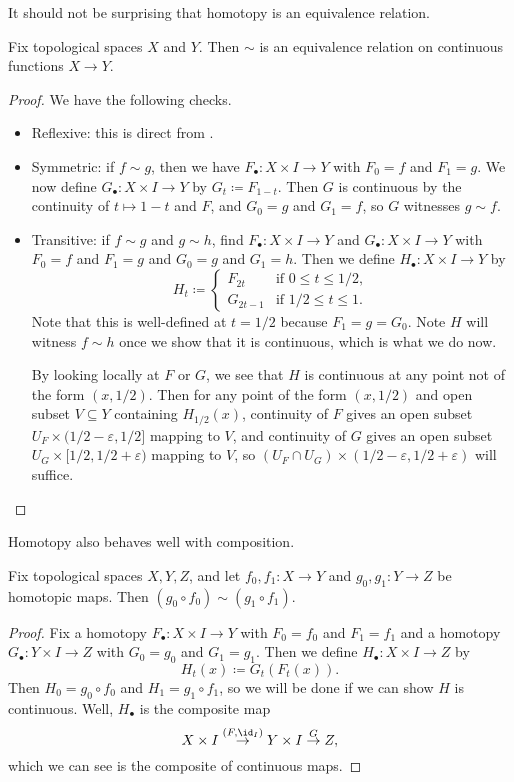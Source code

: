 \documentclass[../notes.tex]{subfiles}
\begin{document}
It should not be surprising that homotopy is an equivalence relation.
\begin{lemma} \label{lem:homotopy-equiv}
	Fix topological spaces $X$ and $Y$. Then $\sim$ is an equivalence relation on continuous functions $X\to Y$.
\end{lemma}
\begin{proof}
	We have the following checks.
	\begin{itemize}
		\item Reflexive: this is direct from .
		\item Symmetric: if $f\sim g$, then we have $F_\bullet\colon X\times I\to Y$ with $F_0=f$ and $F_1=g$. We now define $G_\bullet\colon X\times I\to Y$ by $G_t\coloneqq F_{1-t}$. Then $G$ is continuous by the continuity of $t\mapsto1-t$ and $F$, and $G_0=g$ and $G_1=f$, so $G$ witnesses $g\sim f$.
		\item Transitive: if $f\sim g$ and $g\sim h$, find $F_\bullet\colon X\times I\to Y$ and $G_\bullet\colon X\times I\to Y$ with $F_0=f$ and $F_1=g$ and $G_0=g$ and $G_1=h$. Then we define $H_\bullet\colon X\times I\to Y$ by
		\[H_t\coloneqq\begin{cases}
			F_{2t} & \text{if }0\le t\le1/2, \\
			G_{2t-1} & \text{if }1/2\le t\le1.
		\end{cases}\]
		Note that this is well-defined at $t=1/2$ because $F_1=g=G_0$. Note $H$ will witness $f\sim h$ once we show that it is continuous, which is what we do now.
		
		By looking locally at $F$ or $G$, we see that $H$ is continuous at any point not of the form $(x,1/2)$. Then for any point of the form $(x,1/2)$ and open subset $V\subseteq Y$ containing $H_{1/2}(x)$, continuity of $F$ gives an open subset $U_F\times(1/2-\varepsilon,1/2]$ mapping to $V$, and continuity of $G$ gives an open subset $U_G\times[1/2,1/2+\varepsilon)$ mapping to $V$, so $(U_F\cap U_G)\times(1/2-\varepsilon,1/2+\varepsilon)$ will suffice.
		\qedhere
	\end{itemize}
\end{proof}
Homotopy also behaves well with composition.
\begin{lemma} \label{lem:homotopy-compose}
	Fix topological spaces $X,Y,Z$, and let $f_0,f_1\colon X\to Y$ and $g_0,g_1\colon Y\to Z$ be homotopic maps. Then $(g_0\circ f_0)\sim(g_1\circ f_1)$.
\end{lemma}
\begin{proof}
	Fix a homotopy $F_\bullet\colon X\times I\to Y$ with $F_0=f_0$ and $F_1=f_1$ and a homotopy $G_\bullet\colon Y\times I\to Z$ with $G_0=g_0$ and $G_1=g_1$. Then we define $H_\bullet\colon X\times I\to Z$ by
	\[H_t(x)\coloneqq G_t(F_t(x)).\]
	Then $H_0=g_0\circ f_0$ and $H_1=g_1\circ f_1$, so we will be done if we can show $H$ is continuous. Well, $H_\bullet$ is the composite map
	\[X\times I\stackrel{(F,\id_I)}\to Y\times I\stackrel G\to Z,\]
	which we can see is the composite of continuous maps.
\end{proof}
\end{document}
